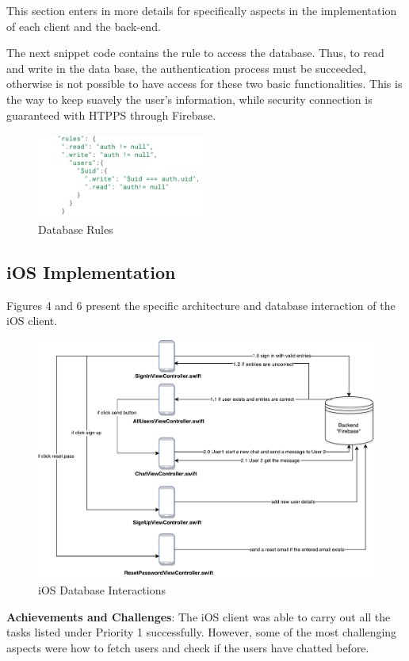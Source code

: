 This section enters in more details for specifically aspects in the implementation of each client and the back-end.

The next snippet code contains the rule to access the database.  Thus, to read and write in the data base, the authentication process must be succeeded, otherwise is not possible to have access for these two basic functionalities. This is the way to keep suavely the user's information, while security connection is guaranteed with HTPPS through Firebase.

\begin{figure}[ht]
\centering
\includegraphics[width=0.5\textwidth]{figs/databaserules}
	\caption{Database Rules}
	\label{fig:databaserules}
\end{figure}

\subsection{iOS Implementation}

Figures 4 and 6 present the specific architecture and database interaction of the iOS client.

\begin{figure}[ht]
\centering
\includegraphics[width=1\textwidth]{figs/iOSarchitecture}
	\caption{iOS Database Interactions}
	\label{fig:iOSarchitecture}
\end{figure}
\textbf{Achievements and Challenges}: The iOS client was able to carry out all the tasks listed under Priority 1 successfully. However, some of the most challenging aspects were how to fetch users and check if the users have chatted before.

